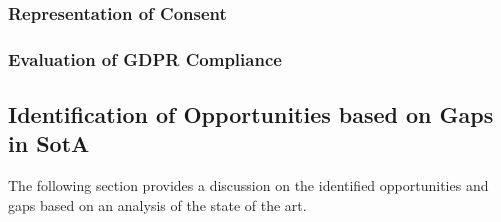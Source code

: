 \subsubsection{Representation of Consent}\label{sota:analysis:consent}

\subsubsection{Evaluation of GDPR Compliance}\label{sota:analysis:compliance}

\subsection{Identification of Opportunities based on Gaps in SotA}
The following section provides a discussion on the identified opportunities and gaps based on an analysis of the state of the art.
